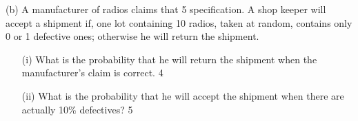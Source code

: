 (b) A manufacturer of radios claims that 5%
specification. A shop keeper will accept a shipment if, one lot containing 10 radios, taken at random, contains only 0 or 1 defective ones; otherwise he will return the shipment. 

\begin{itemize} 
	\item[(i)] What is the probability that he will return the shipment when the  manufacturer's claim  is correct. 4  
	
	\item[(ii)] What is the probability that he will accept the shipment when there are actually 10\%  defectives? 5 
\end{itemize}


